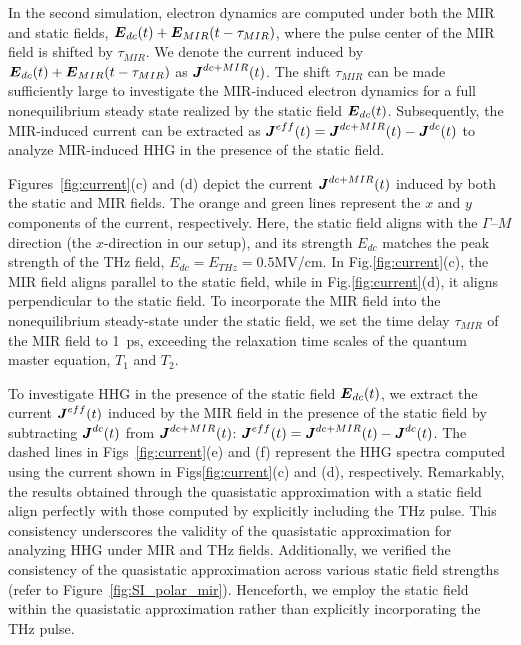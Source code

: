 In the second simulation, electron dynamics are computed under both the MIR and static fields, $\boldsymbol E_{dc}(t) + \boldsymbol E_{MIR}(t - \tau_{MIR})$, where the pulse center of the MIR field is shifted by $\tau_{MIR}$. We denote the current induced by $\boldsymbol E_{dc}(t) + \boldsymbol E_{MIR}(t - \tau_{MIR})$ as $\boldsymbol J^{dc+MIR}(t)$. The shift $\tau_{MIR}$ can be made sufficiently large to investigate the MIR-induced electron dynamics for a full nonequilibrium steady state realized by the static field $\boldsymbol E_{dc}(t)$. Subsequently, the MIR-induced current can be extracted as $\boldsymbol J^{eff}(t) = \boldsymbol J^{dc+MIR}(t) - \boldsymbol J^{dc}(t)$ to analyze MIR-induced HHG in the presence of the static field.

Figures~\ref{fig:current}(c) and (d) depict the current $\boldsymbol J^{dc+MIR}(t)$ induced by both the static and MIR fields. The orange and green lines represent the $x$ and $y$ components of the current, respectively. Here, the static field aligns with the $\Gamma$--$M$ direction (the $x$-direction in our setup), and its strength $E_{dc}$ matches the peak strength of the THz field, $E_{dc}=E_{THz}=0.5$MV/cm. In Fig.\ref{fig:current}(c), the MIR field aligns parallel to the static field, while in Fig.\ref{fig:current}(d), it aligns perpendicular to the static field. To incorporate the MIR field into the nonequilibrium steady-state under the static field, we set the time delay $\tau_{MIR}$ of the MIR field to 1~ps, exceeding the relaxation time scales of the quantum master equation, $T_1$ and $T_2$.

To investigate HHG in the presence of the static field $\boldsymbol E_{dc}(t)$, we extract the current
$\boldsymbol J^{eff}(t)$ induced by the MIR field in the presence of the static field by subtracting
$\boldsymbol J^{dc}(t)$ from $\boldsymbol J^{dc+MIR}(t)$: $\boldsymbol J^{eff}(t)=\boldsymbol J^{dc+MIR}(t)-\boldsymbol
J^{dc}(t)$. The dashed lines in Figs~\ref{fig:current}(e) and (f) represent the HHG spectra
computed using the current shown in Figs\ref{fig:current}(c) and (d), respectively. Remarkably, the
results obtained through the quasistatic approximation with a static field align perfectly with
those computed by explicitly including the THz pulse. This consistency underscores the validity of
the quasistatic approximation for analyzing HHG under MIR and THz fields. Additionally, we verified
the consistency of the quasistatic approximation across various static field strengths (refer to
Figure~\ref{fig:SI_polar_mir}). Henceforth, we employ the static field within the quasistatic approximation rather than explicitly incorporating the THz pulse. 

